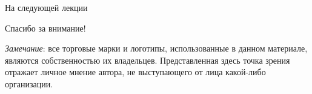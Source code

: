 \begin{frame}{На следующей лекции}
\end{frame}

\begin{frame}

{\huge{Спасибо за внимание!}\par}

\vfill

\tiny{\textit{Замечание}: все торговые марки и логотипы, использованные в данном материале, являются собственностью их владельцев. Представленная здесь точка зрения отражает личное мнение автора, не выступающего от лица какой-либо организации.}

\end{frame}


